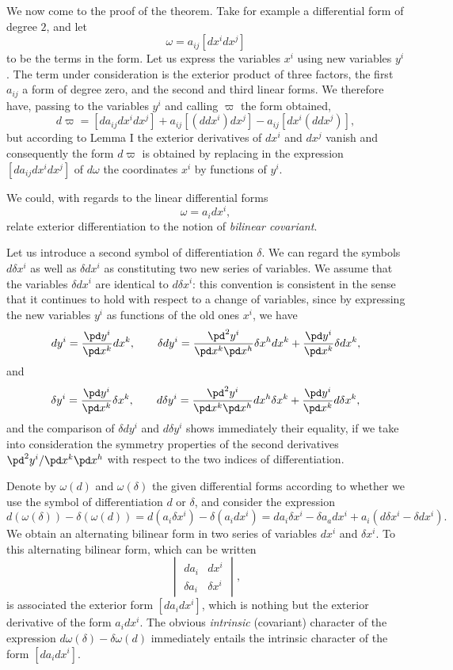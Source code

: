\vspace{12pt}\fsec We now come to the proof of the theorem. Take for example a differential form of degree $2$, and let
\[
\omega=a_{ij}[dx^{i}dx^{j}]
\]
to be the terms in the form. Let us express the variables $x^{i}$ using new variables $y^{i}$. The term under consideration is the exterior product of three factors, the first $a_{ij}$ a form of degree zero, and the second and third linear forms. We therefore have, passing to the variables $y^{i}$ and calling $\varpi$ the form obtained,
\[
d\varpi=[da_{ij}dx^{i}dx^{j}]+a_{ij}[(ddx^{i})dx^{j}]-a_{ij}[dx^{i}(ddx^{j})],
\]
but according to Lemma I the exterior derivatives of $dx^{i}$ and $dx^{j}$ vanish and consequently the form $d\varpi$ is obtained by replacing in the expression $[da_{ij}dx^{i}dx^{j}]$ of $d\omega$ the coordinates $x^{i}$ by functions of $y^{i}$.

\vspace{12pt}\fsec We could, with regards to the linear differential forms
\[
\omega=a_{i}dx^{i},
\]
relate exterior differentiation to the notion of \emph{bilinear covariant}.

Let us introduce a second symbol of differentiation $\delta$. We can regard the symbols $d\delta x^{i}$ as well as $\delta d x^{i}$ as constituting two new series of variables.  We  assume that the variables $\delta dx^{i}$ are identical to  $d\delta x^{i}$: this convention is consistent in the sense that it continues to hold with respect to a change of variables, since by expressing the new variables $y^{i}$ as functions of the old ones $x^{i}$, we have
\[
dy^{i}=\frac{\pd y^{i}}{\pd x^{k}}dx^{k},\qquad \delta dy^{i}=\frac{\pd^{2}y^{i}}{\pd x^{k}\pd x^{h}}\delta x^{h}dx^{k}+\frac{\pd y^{i}}{\pd x^{k}}\delta dx^{k},
\]
and
\[
\delta y^{i}=\frac{\pd y^{i}}{\pd x^{k}}\delta x^{k},\qquad d\delta y^{i}=\frac{\pd^{2}y^{i}}{\pd x^{k}\pd x^{h}}d x^{h}\delta x^{k}+\frac{\pd y^{i}}{\pd x^{k}}d\delta x^{k},
\]
and the comparison of $\delta d y^{i}$ and $d\delta y^{i}$ shows immediately their equality, if we take into consideration the symmetry properties of the second derivatives $\pd ^{2}y^{i}/\pd x^{k}\pd x^{h}$ with respect to the two indices of differentiation.

Denote by $\omega(d)$ and $\omega(\delta)$ the given differential forms according to whether we use the symbol of differentiation $d$ or $\delta$, and consider the expression
\[
d(\omega(\delta))-\delta(\omega(d))=d(a_{i}\delta x^{i})-\delta(a_{i}dx^{i})=da_{i}\delta x^{i}-\delta a_{a}dx^{i}+a_{i}(d\delta x^{i}-\delta dx^{i}).
\]
We obtain an alternating bilinear form in two series of variables $dx^{i}$ and $\delta x^{i}$. To this alternating bilinear form, which can be written
\[
\begin{vmatrix}
  da_{i}&dx^{i}\\
  \delta a_{i}&\delta x^{i}
\end{vmatrix},
\]
is associated the exterior form $[da_{i}dx^{i}]$, which is nothing but the exterior derivative of the form $a_{i}dx^{i}$. The obvious \emph{intrinsic} (covariant) character of the expression $d\omega(\delta)-\delta\omega(d)$ immediately entails the intrinsic character of the form $[da_{i}dx^{i}]$.

